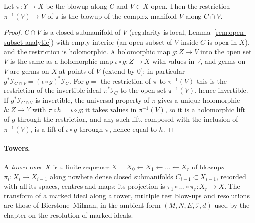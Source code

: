 \begin{lemma}
\label{bcalc:restrict-open}
\mixedleanok
Let \(\pi\colon Y\to X\) be the blowup along \(C\) and \(V\subset X\) open. Then the restriction
\(\pi^{-1}(V)\to V\) of \(\pi\) is the blowup of the complex manifold \(V\) along \(C\cap V\).
\end{lemma}
\begin{proof}
\mixedleanok
\(C\cap V\) is a closed submanifold of \(V\) (regularity is local, Lemma~\ref{rem:open-subset-analytic}) with empty interior (an open
subset of \(V\) inside \(C\) is open in \(X\)), and the restriction is holomorphic. A holomorphic map \(g\colon Z\to V\) into the
open set \(V\) is the same as a holomorphic map \(\iota\circ g\colon Z\to X\) with values in \(V\), and germs on \(V\) are germs on
\(X\) at points of \(V\) (extend by \(0\)); in particular \(g^*\mathcal I_{C\cap V}=(\iota\circ g)^*\mathcal I_C\). For \(g=\) the
restriction of \(\pi\) to \(\pi^{-1}(V)\) this is the restriction of the invertible ideal \(\pi^*\mathcal I_C\) to the open set
\(\pi^{-1}(V)\), hence invertible. If \(g^*\mathcal I_{C\cap V}\) is invertible, the universal property of \(\pi\) gives a unique
holomorphic \(h\colon Z\to Y\) with \(\pi\circ h=\iota\circ g\); it takes values in \(\pi^{-1}(V)\), so it is a holomorphic lift
of \(g\) through the restriction, and any such lift, composed with the inclusion of \(\pi^{-1}(V)\), is a lift of \(\iota\circ g\)
through \(\pi\), hence equal to \(h\).
\end{proof}

\paragraph{Towers.} A \emph{tower} over \(X\) is a finite sequence \(X=X_0\leftarrow X_1\leftarrow\dots\leftarrow X_r\) of blowups
\(\pi_i\colon X_i\to X_{i-1}\) along nowhere dense closed submanifolds \(C_{i-1}\subset X_{i-1}\), recorded with all its spaces,
centres and maps; its projection is \(\pi_1\circ\dots\circ\pi_r\colon X_r\to X\). The transform of a marked ideal along a tower,
multiple test blow-ups and resolutions are those of Bierstone--Milman, in the ambient form \((M,N,E,\mathcal I,d)\) used by the
chapter on the resolution of marked ideals.


